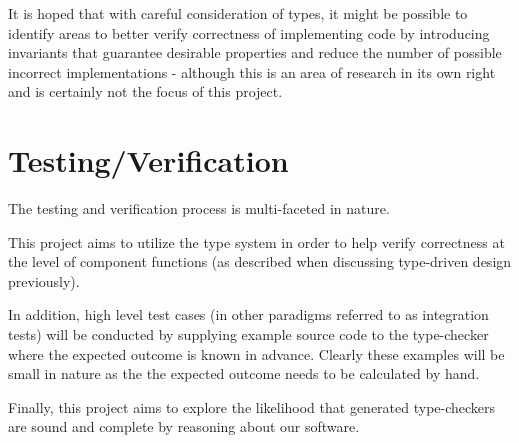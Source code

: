 \documentclass{ProgressReport}[2020/09/15]
\begin{document}
        It is hoped that with careful consideration of types, it might
        be possible to identify areas to better verify correctness of
        implementing code by introducing invariants that guarantee desirable
        properties and reduce the number of possible incorrect
        implementations - although this is an area of research in its
        own right and is certainly not the focus of this project.
        
        \section{Testing/Verification}

        The testing and verification process is multi-faceted in
        nature.

        This project aims to utilize the type system in
        order to help verify correctness at the level of component
        functions (as described when discussing type-driven design
        previously).

        In addition, high level test cases (in other paradigms
        referred to as integration tests) will be conducted by
        supplying example source code to the type-checker where the
        expected outcome is known in advance. Clearly these examples
        will be small in nature as the the expected outcome needs to
        be calculated by hand.

        Finally, this project aims to explore the likelihood that generated
        type-checkers are sound and complete by reasoning about our
        software. 
        	
	
	
	\clearpage
	\printbibliography
	\nocite{*} %
\end{document}
